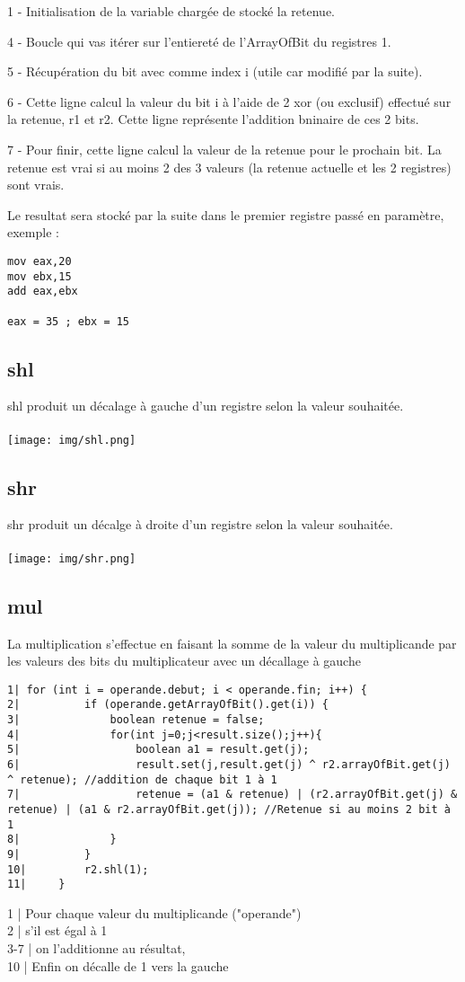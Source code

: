 \documentclass{article}
\begin{document}
1 - Initialisation de la variable chargée de stocké la retenue.

4 - Boucle qui vas itérer sur l'entiereté de l'ArrayOfBit du registres 1.

5 - Récupération du bit avec comme index i (utile car modifié par la suite).

6 - Cette ligne calcul la valeur du bit i à l'aide de 2 xor (ou exclusif) effectué sur la retenue, r1 et r2. Cette ligne représente l'addition bninaire de ces 2 bits.

7 - Pour finir, cette ligne calcul la valeur de la retenue pour le prochain bit. La retenue est vrai si au moins 2 des 3 valeurs (la retenue actuelle et les 2 registres) sont vrais.

Le resultat sera stocké par la suite dans le premier registre passé en paramètre, exemple :
\begin{verbatim}
mov eax,20
mov ebx,15
add eax,ebx

eax = 35 ; ebx = 15
\end{verbatim}

\newpage
\subsection{shl}
shl produit un décalage à gauche d'un registre selon la valeur souhaitée.
\\
\\
\texttt{[image: img/shl.png]}

\subsection{shr}
shr produit un décalge à droite d'un registre selon la valeur souhaitée.
\\
\\
\texttt{[image: img/shr.png]}
\newpage
\subsection{mul}
La multiplication s'effectue en faisant la somme de la valeur du multiplicande par les valeurs des bits du multiplicateur avec un décallage à gauche
\begin{verbatim}
1| for (int i = operande.debut; i < operande.fin; i++) {
2|          if (operande.getArrayOfBit().get(i)) {
3|              boolean retenue = false;
4|              for(int j=0;j<result.size();j++){
5|                  boolean a1 = result.get(j);
6|                  result.set(j,result.get(j) ^ r2.arrayOfBit.get(j) ^ retenue); //addition de chaque bit 1 à 1
7|                  retenue = (a1 & retenue) | (r2.arrayOfBit.get(j) & retenue) | (a1 & r2.arrayOfBit.get(j)); //Retenue si au moins 2 bit à 1
8|              }
9|          }
10|         r2.shl(1);
11|     }
\end{verbatim}
1 | Pour chaque valeur du multiplicande ("operande")\\
2 | s'il est égal à 1\\
3-7 | on l'additionne au résultat,\\
10 | Enfin on décalle de 1 vers la gauche\\
\end{document}
